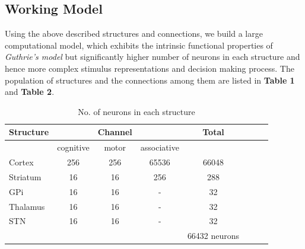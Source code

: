 \documentclass[11pt]{article}
\begin{document}
\subsection{Working Model}
Using the above described structures and connections, we build a large computational model, which exhibits the intrinsic functional properties of \emph{Guthrie's model} but significantly higher number of neurons in each structure and hence more complex stimulus representations and decision making process. The population of structures and the connections among them are listed in \textbf{Table 1} and \textbf{Table 2}.
\begin{table}
\centering
\begin{tabular}{l*{6}{c}r}
Structure         &  & Channel &  & Total \\
\hline
         & cognitive & motor & associative &  \\
\hline
Cortex   & 256 & 256 & 65536 & 66048  \\
Striatum &  16 &  16 &   256 &   288  \\
GPi      &  16 &  16 &   -   &    32  \\
Thalamus &  16 &  16 &   -   &    32  \\
STN      &  16 &  16 &   -   &    32  \\
\hline
         &     &     &       & 66432 neurons \\
\hline
\end{tabular}
\caption{No. of neurons in each structure}\label{table:model}
\end{table}
\end{document}
